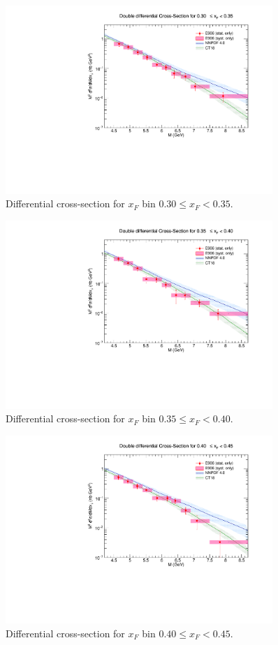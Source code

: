 \documentclass[11pt]{article}
\begin{document}
\clearpage
\begin{figure}[p]
\centering
\includegraphics[width=0.9\textwidth]{./XSecPlots/LH2_6_roofit.pdf}
\caption{Differential cross-section for $x_F$ bin $0.30 \leq x_F < 0.35$.}
\end{figure}
\clearpage
\begin{figure}[p]
\centering
\includegraphics[width=0.9\textwidth]{./XSecPlots/LH2_7_roofit.pdf}
\caption{Differential cross-section for $x_F$ bin $0.35 \leq x_F < 0.40$.}
\end{figure}
\clearpage
\begin{figure}[p]
\centering
\includegraphics[width=0.9\textwidth]{./XSecPlots/LH2_8_roofit.pdf}
\caption{Differential cross-section for $x_F$ bin $0.40 \leq x_F < 0.45$.}
\end{figure}
\end{document}
